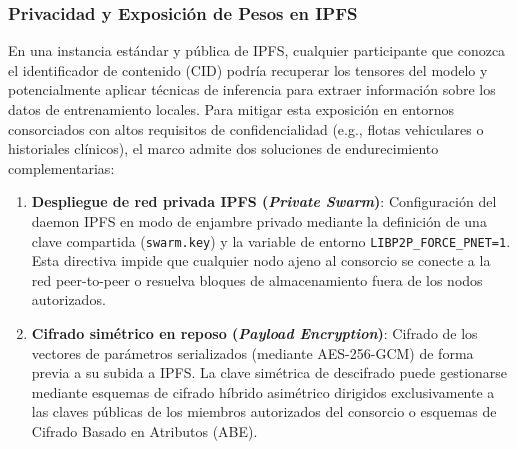 \subsubsection{Privacidad y Exposición de Pesos en IPFS}
En una instancia estándar y pública de IPFS, cualquier participante que conozca el identificador de contenido (CID) podría recuperar los tensores del modelo y potencialmente aplicar técnicas de inferencia para extraer información sobre los datos de entrenamiento locales. Para mitigar esta exposición en entornos consorciados con altos requisitos de confidencialidad (e.g., flotas vehiculares o historiales clínicos), el marco admite dos soluciones de endurecimiento complementarias:
\begin{enumerate}
    \item \textbf{Despliegue de red privada IPFS (\textit{Private Swarm})}: Configuración del daemon IPFS en modo de enjambre privado mediante la definición de una clave compartida (\texttt{swarm.key}) y la variable de entorno \texttt{LIBP2P\_FORCE\_PNET=1}. Esta directiva impide que cualquier nodo ajeno al consorcio se conecte a la red peer-to-peer o resuelva bloques de almacenamiento fuera de los nodos autorizados.
    \item \textbf{Cifrado simétrico en reposo (\textit{Payload Encryption})}: Cifrado de los vectores de parámetros serializados (mediante AES-256-GCM) de forma previa a su subida a IPFS. La clave simétrica de descifrado puede gestionarse mediante esquemas de cifrado híbrido asimétrico dirigidos exclusivamente a las claves públicas de los miembros autorizados del consorcio o esquemas de Cifrado Basado en Atributos (ABE).
\end{enumerate}
